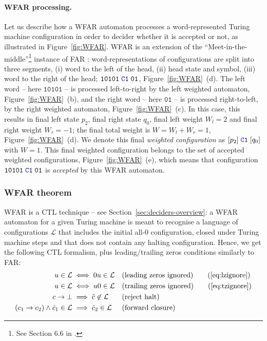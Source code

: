 \paragraph{WFAR processing.} Let us describe how a WFAR automaton processes a word-represented Turing machine configuration in order to decider whether it is accepted or not, as illustrated in Figure~\ref{fig:WFAR}. WFAR is an extension of the ``Meet-in-the-middle''\footnote{See Section 6.6 in \cite{bbchallenge_part1}.} instance of FAR \cite{bbchallenge_part1}: word-representations of configurations are split into three segments, (i) word to the left of the head, (ii) head state and symbol, (iii) word to the right of the head; \eg $\texttt{10101}\; \texttt{\stateC}\sone\; \texttt{01}$, Figure~\ref{fig:WFAR}~(d). The left word -- here $\texttt{10101}$ -- is processed left-to-right by the left weighted automaton, Figure~\ref{fig:WFAR}~(b), and the right word -- here $\texttt{01}$ -- is processed right-to-left, by the right weighted automaton, Figure~\ref{fig:WFAR}~(c). In this case, this results in final left state $p_2$, final right state $q_0$, final left weight $W_l = 2$ and final right weight $W_r = -1$; the final total weight is $W = W_l + W_r = 1$, Figure~\ref{fig:WFAR}~(d). We denote this final \textit{weighted configuration} as $[p_2]\; \texttt{\stateC}\sone\; [q_0]$ with $W=1$. This final weighted configuration belongs to the set of accepted weighted configurations, Figure~\ref{fig:WFAR}~(e), which means that configuration $\texttt{10101}\; \texttt{\stateC}\sone\; \texttt{01}$ is \textit{accepted} by this WFAR automaton.


\subsubsection{WFAR theorem}

WFAR is a CTL technique -- see Section~\ref{sec:deciders-overview}: a WFAR automaton for a given Turing machine is meant to recognise a language of configurations $\mathcal{L}$ that includes the initial all-0 configuration, closed under Turing machine steps and that does not contain any halting configuration. Hence, we get the following CTL formalism, plus leading/trailing zeros conditions similarly to FAR:
\begin{align}
    u \in \mathcal{L}                               & \iff 0u \in \mathcal{L}               &  & \text{(leading zeros ignored)}
    \tag{\ref{eq:lzignore}}
    \\
    u \in \mathcal{L}                               & \iff u0 \in \mathcal{L}               &  & \text{(trailing zeros ignored)}
    \tag{\ref{eq:tzignore}}
    \\
    c\TMstep\bot                                    & \implies \hat{c} \not \in \mathcal{L} &  & \text{(reject halt)} \label{eq:rejecthalt}     \\
    (c_1\TMstep c_2)\land \hat{c}_1 \in \mathcal{L} & \implies\hat{c}_2 \in \mathcal{L}     &  & \text{(forward closure)} \label{eq:forwardclo}
\end{align}

